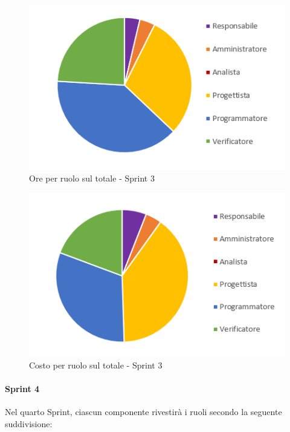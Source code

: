 \begin{figure}[H]
  \centering
  \includegraphics[scale=0.8]{immagini/3Sprint_oreRuolo.png}
  \caption{Ore per ruolo sul totale - Sprint 3}
\end{figure}

\begin{figure}[H]
  \centering
  \includegraphics[scale=0.8]{immagini/3Sprint_costoRuolo.png}
  \caption{Costo per ruolo sul totale - Sprint 3}
\end{figure}
\pagebreak

\paragraph{Sprint 4}
Nel quarto Sprint\glo{}, ciascun componente rivestirà i ruoli secondo la seguente suddivisione:

